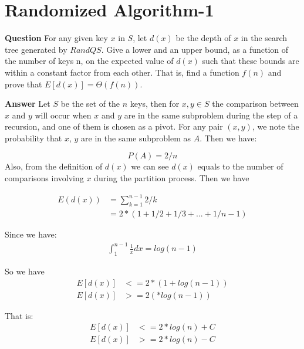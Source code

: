 \documentclass[12pt]{article}
\begin{document}
\section{Randomized Algorithm-1}
\textbf{Question}
For any given key $x$ in $S$, let $d(x)$ be the depth of $x$ in the search tree generated by $RandQS$. Give a lower and an upper bound, as a function of the number of keys n, on the expected value of $d(x)$ such that these bounds are within a constant factor from each other. That is, find a function $f(n)$ and prove that $E[d(x)]=\Theta(f(n))$.

\textbf{Answer}
Let $S$ be the set of the $n$ keys, then for $x,y \in S$ the comparison between $x$ and $y$ will occur when $x$ and $y$ are in the same subproblem during the step of a recursion, and one of them is chosen as a pivot. For any pair $(x,y)$, we note the probability that $x$, $y$ are in the same subproblem as $A$. Then we have:

\begin{equation}
P(A) = 2/n
\end{equation}
Also, from the definition of $d(x)$ we can see $d(x)$ equals to the number of comparisons involving $x$ during the partition process. Then we have 

\begin{equation}
\begin{aligned}
E(d(x)) &= \sum_{k=1}^{n-1} 2/k\\
&= 2*(1 + 1/2 + 1/3 + ... + 1/n-1)
\end{aligned}
\end{equation}

Since we have:
\begin{equation}
\begin{aligned}
\int_{1}^{n-1} \frac{1}{x} dx = log(n-1)
\end{aligned}
\end{equation}

So we have
\begin{equation}
\begin{aligned}
E[d(x)] &<= 2*(1 + log(n-1))\\
E[d(x)] &>= 2(*log(n-1))
\end{aligned}
\end{equation}

That is:
\begin{equation}
\begin{aligned}
E[d(x)] &<= 2*log(n) + C\\
E[d(x)] &>= 2*log(n) - C
\end{aligned}
\end{equation}
\end{document}
